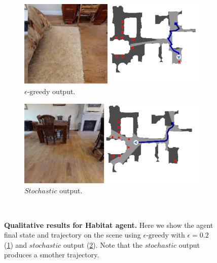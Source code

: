 \begin{figure}
    \centering
    \begin{subfigure}[b]{0.49\textwidth}
        \centering
        \includegraphics[width=\textwidth]{figures/understanding_vsn/qualitative_results/habitat_epsilon}
        \caption{$\epsilon\text{-greedy}$ output.}
        \label{fig:habitat_qualitative_epsilon}
    \end{subfigure}
    \hfill
    \begin{subfigure}[b]{0.49\textwidth}
        \centering
        \includegraphics[width=\textwidth]{figures/understanding_vsn/qualitative_results/habitat_stochastic}
        \caption{$Stochastic$ output.}
        \label{fig:habitat_qualitative_stochastic}
    \end{subfigure}~\caption{\textbf{Qualitative results for Habitat agent.} Here we show the agent final state and trajectory on the scene using $\epsilon\text{-greedy}$ with $\epsilon = 0.2$ (\ref{fig:habitat_qualitative_epsilon}) and $stochastic$ output (\ref{fig:habitat_qualitative_stochastic}). Note that the $stochastic$ output produces a smother trajectory.}
    \label{fig:habitat_qualitative}
\end{figure}

